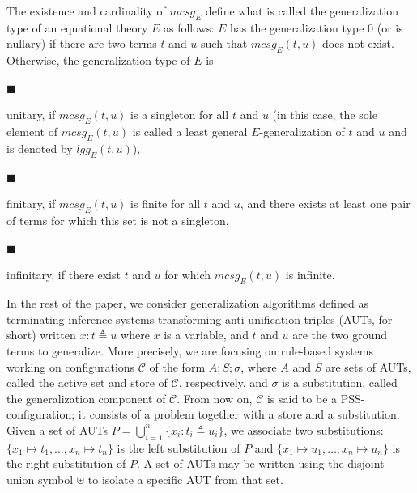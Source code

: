 \documentclass[10pt,a4paper]{amsart}
\begin{document}
 
The existence and cardinality of $\mathit{mcsg}_{E}$ define what is called the generalization type of an equational theory $E$ as follows: $E$ has the generalization type 0 (or is nullary) if there are two terms $t$ and $u$ such that $\mathit{mcsg}_{E}(t,u)$ does not exist. Otherwise, the generalization type of $E$ is\par
  
\par\noindent  $\blacksquare$ 
 
unitary, if $\mathit{mcsg}_{E}(t,u)$ is a singleton for all $t$ and $u$ (in this case, the sole element of $\mathit{mcsg}_{E}(t,u)$ is called a least general $E$-generalization of $t$ and $u$ and is denoted by $\mathit{lgg}_{E}(t,u)$),\par
 
 
 
\par\noindent  $\blacksquare$ 
 
finitary, if $\mathit{mcsg}_{E}(t,u)$ is finite for all $t$ and $u$, and there exists at least one pair of terms for which this set is not a singleton,\par
 
 
 
\par\noindent  $\blacksquare$ 
 
infinitary, if there exist $t$ and $u$ for which $\mathit{mcsg}_{E}(t,u)$ is infinite.\par
 
 
  
 
 
In the rest of the paper, we consider generalization algorithms defined as terminating inference systems transforming anti-unification triples (AUTs, for short) written $x:t\triangleq u$ where $x$ is a variable, and $t$ and $u$ are the two ground terms to generalize. More precisely, we are focusing on rule-based systems working on configurations $\mathcal{C}$ of the form $A;S;\sigma$, where $A$ and $S$ are sets of AUTs, called the active set and store of $\mathcal{C}$, respectively, and $\sigma$ is a substitution, called the generalization component of $\mathcal{C}$. From now on, $\mathcal{C}$ is said to be a PSS-configuration; it consists of a problem together with a store and a substitution. Given a set of AUTs $P=\bigcup_{i=1}^{n}\{x_{i}:t_{i}\triangleq u_{i}\}$, we associate two substitutions: $\{x_{1}\mapsto t_{1},\allowbreak\dots,x_{n}\mapsto t_{n}\}$ is the left substitution of $P$ and $\{x_{1}\mapsto u_{1},\dots,x_{n}\mapsto u_{n}\}$ is the right substitution of $P$. A set of AUTs may be written using the disjoint union symbol $\uplus$ to isolate a specific AUT from that set.\par
 
\end{document}

